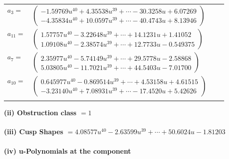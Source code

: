 \documentclass[1p]{elsarticle_modified}
\theoremstyle{definition}
\begin{document}
\begin{tabular}{m{7pt} m{180pt} m{7pt} m{180pt} }
\flushright $a_{3}=$&$\begin{pmatrix}-1.59769 u^{40}+4.35538 u^{39}+\cdots-30.3258 u+6.07269\\-4.35834 u^{40}+10.0597 u^{39}+\cdots-40.4743 u+8.13946\end{pmatrix}$ \\
\flushright $a_{11}=$&$\begin{pmatrix}1.57757 u^{40}-3.22648 u^{39}+\cdots+14.1231 u+1.41052\\1.09108 u^{40}-2.38574 u^{39}+\cdots+12.7733 u-0.549375\end{pmatrix}$ \\
\flushright $a_{7}=$&$\begin{pmatrix}2.35977 u^{40}-5.74149 u^{39}+\cdots+29.5778 u-2.58868\\5.03805 u^{40}-11.7021 u^{39}+\cdots+44.5403 u-7.01700\end{pmatrix}$ \\
\flushright $a_{10}=$&$\begin{pmatrix}0.645977 u^{40}-0.869514 u^{39}+\cdots+4.53158 u+4.61515\\-3.23140 u^{40}+7.08931 u^{39}+\cdots-17.4520 u+5.42626\end{pmatrix}$\\&\end{tabular}
\flushleft \textbf{(ii) Obstruction class $= 1$}\\~\\
\flushleft \textbf{(iii) Cusp Shapes $= 4.08577 u^{40}-2.63599 u^{39}+\cdots+50.6024 u-1.81203$}\\~\\
\newpage\renewcommand{\arraystretch}{1}
\flushleft \textbf{(iv) u-Polynomials at the component}\newline \\
\end{document}
